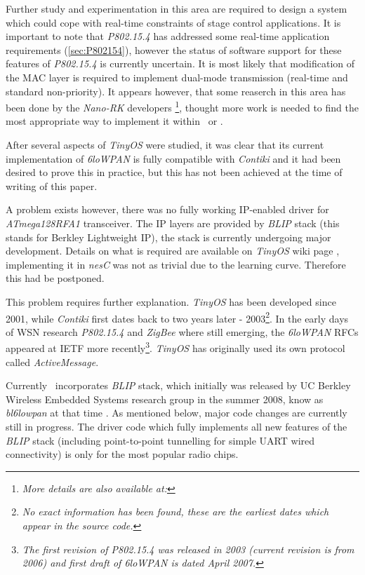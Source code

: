   Further study and experimentation in this area are required to design
 a system which could cope with real-time constraints of stage control
 applications. It is important to note that \emph{P802.15.4} has addressed
 some real-time application requirements (\ref{sec:P802154}), however the
 status of software support for these features of \emph{P802.15.4} is
 currently uncertain. It is most likely that modification of the MAC layer
 is required to implement dual-mode transmission (real-time and standard
 non-priority). It appears however, that some reaserch
 in this area has been done by the \emph{Nano-RK} developers
 \cite{pubs:nrk06c}\footnote{\emph{More details are also available at:
 }}, thought more work is needed
 to find the most appropriate way to implement it within \TinyOS\ or
 \Contiki.
 
  After several aspects of \emph{TinyOS} were studied, it was clear
 that its current implementation of \emph{6loWPAN} is fully compatible
 with \emph{Contiki} and it had been desired to prove this in practice,
 but this has not been achieved at the time of writing of this paper.
  
  A problem exists however, there was no fully working IP-enabled driver
 for \emph{ATmega128RFA1} transceiver. The IP layers are provided by
 \emph{BLIP} stack (this stands for Berkley Lightweight IP), the stack
 is currently undergoing major development. Details on what is required
 are available on \emph{TinyOS} wiki page \cite{tinyos:wiki:blip20},
 implementing it in \emph{nesC} was not as trivial due to the learning
 curve. Therefore this had be postponed.

  This problem requires further explanation. \emph{TinyOS} has been
 developed since 2001, while \emph{Contiki} first dates back to two
 years later - 2003\footnote{\emph{No exact information has been
 found, these are the earliest dates which appear in the source code.}}. 
 In the early days of WSN research \emph{P802.15.4} and \emph{ZigBee}
 where still emerging, the \emph{6loWPAN} RFCs appeared at IETF more
 recently\footnote{\emph{The first revision of P802.15.4 was released
 in 2003 (current revision is from 2006) and first draft of 6loWPAN
 is dated April 2007.}}. \emph{TinyOS} has originally used its own
 protocol called \emph{ActiveMessage}.

  Currently \TinyOS\ incorporates \emph{BLIP} stack, which initially
 was released by UC Berkley Wireless Embedded Systems research group
 in the summer 2008, know as \emph{bl6lowpan} at that time \cite{ucb:webs:blip}.
 As mentioned below, major code changes are currently still in progress.
 The driver code which fully implements all new features of the \emph{BLIP}
 stack (including point-to-point tunnelling for simple UART wired
 connectivity) is only for the most popular  radio chips.

